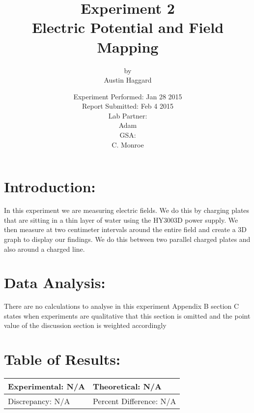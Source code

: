 \documentclass{article}
\title{Experiment 2 \\ Electric Potential and Field Mapping}
\author{by \\ Austin Haggard}
\date{
	Experiment Performed: Jan 28 2015 \\
	Report Submitted: Feb 4 2015 \\[11pt]
	Lab Partner: \\ Adam \\[11pt] 
	GSA: \\ C. Monroe
}
\begin{document}
\maketitle
\thispagestyle{empty}
\newpage

\section*{Introduction:}
\setcounter{page}{1}
In this experiment we are measuring electric fields.  We do this by charging plates that are sitting in a thin layer of water using the HY3003D power supply. We then measure at two centimeter intervals around the entire field and create a 3D graph to display our findings.  We do this between two parallel charged plates and also around a charged line.
\newpage


\section*{Data Analysis:}
\setcounter{page}{3}
There are no calculations to analyse in this experiment  Appendix B section C states when experiments are qualitative that this section is omitted and the point value of the discussion section is weighted accordingly
\newpage

\section*{Table of Results:}
\begin{center}
\begin{tabular}{|l|l|}
\hline
	Experimental: N/A & Theoretical: N/A  \\ \hline
	Discrepancy: N/A   & Percent Difference: N/A \\
\hline
\end{tabular}
\end{center}
\end{document}
